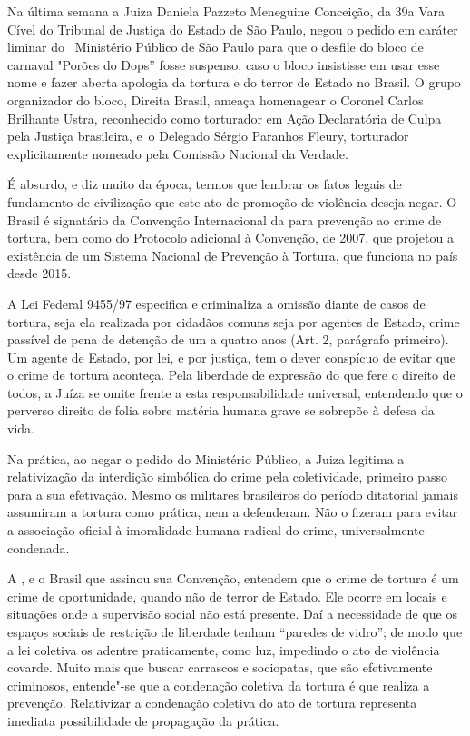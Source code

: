 Na última semana a Juiza Daniela Pazzeto Meneguine Conceição, da 39a
Vara Cível do Tribunal de Justiça do Estado de São Paulo, negou o pedido
em caráter liminar do~ Ministério Público de São Paulo para que o
desfile do bloco de carnaval "Porões do Dops'' fosse suspenso, caso o
bloco insistisse em usar esse nome e fazer aberta apologia da tortura e
do terror de Estado no Brasil. O grupo organizador do bloco, Direita
Brasil, ameaça homenagear o Coronel Carlos Brilhante Ustra, reconhecido
como torturador em Ação Declaratória de Culpa pela Justiça brasileira,
e~o Delegado Sérgio Paranhos Fleury, torturador explicitamente nomeado
pela Comissão Nacional da Verdade.

É absurdo, e diz muito da época, termos que lembrar os fatos legais de
fundamento de civilização que este ato de promoção de violência deseja
negar. O Brasil é signatário da Convenção Internacional da  para
prevenção ao crime de tortura, bem como do Protocolo adicional à
Convenção, de 2007, que projetou a existência de um Sistema Nacional de
Prevenção à Tortura, que funciona no país desde 2015.

A Lei Federal 9455/97 especifica e criminaliza a omissão diante de casos
de tortura, seja ela realizada por cidadãos comuns seja por agentes de
Estado, crime passível de pena de detenção de um a quatro anos (Art. 2,
parágrafo primeiro). Um agente de Estado, por lei, e por justiça, tem o
dever conspícuo de evitar que o crime de tortura aconteça. Pela
liberdade de expressão do que fere o direito de todos, a Juíza se omite
frente a esta responsabilidade universal, entendendo que o perverso
direito de folia sobre matéria humana grave se sobrepõe à defesa da
vida.

Na prática, ao negar o pedido do Ministério Público, a Juiza legitima a
relativização da interdição simbólica do crime pela coletividade,
primeiro passo para a sua efetivação. Mesmo os militares brasileiros do
período ditatorial jamais assumiram a tortura como prática, nem a
defenderam. Não o fizeram para evitar a associação oficial à imoralidade
humana radical do crime, universalmente condenada.

A , e o Brasil que assinou sua Convenção, entendem que o crime de
tortura é um crime de oportunidade, quando não de terror de Estado. Ele
ocorre em locais e situações onde a supervisão social não está presente.
Daí a necessidade de que os espaços sociais de restrição de liberdade
tenham ``paredes de vidro''; de modo que a lei coletiva os adentre
praticamente, como luz, impedindo o ato de violência covarde. Muito mais
que buscar carrascos e sociopatas, que são efetivamente criminosos,
entende"-se que a condenação coletiva da tortura é que realiza a
prevenção. Relativizar a condenação coletiva do ato de tortura
representa imediata possibilidade de propagação da prática.

